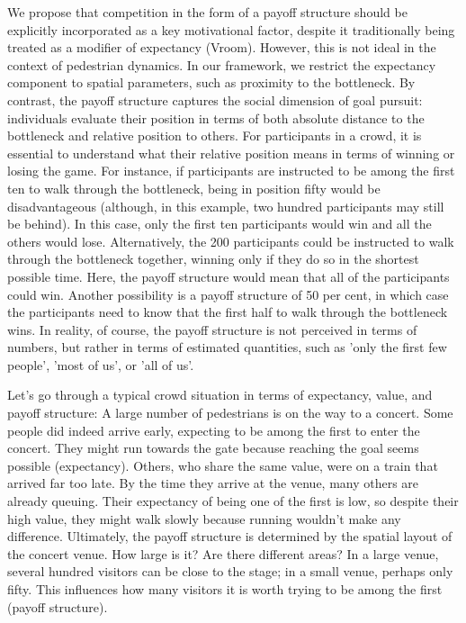 \documentclass[pdflatex,sn-mathphys-num]{sn-jnl}%
\theoremstyle{thmstyleone}%
\theoremstyle{thmstyletwo}%
\theoremstyle{thmstylethree}%
\begin{document}
We propose that competition in the form of a payoff structure should be explicitly incorporated as a key motivational factor, despite it traditionally being treated as a modifier of expectancy (Vroom). However, this is not ideal in the context of pedestrian dynamics. In our framework, we restrict the expectancy component to spatial parameters, such as proximity to the bottleneck. By contrast, the payoff structure captures the social dimension of goal pursuit: individuals evaluate their position in terms of both absolute distance to the bottleneck and relative position to others. For participants in a crowd, it is essential to understand what their relative position means in terms of winning or losing the game. For instance, if participants are instructed to be among the first ten to walk through the bottleneck, being in position fifty would be disadvantageous (although, in this example, two hundred participants may still be behind). In this case, only the first ten participants would win and all the others would lose. Alternatively, the 200 participants could be instructed to walk through the bottleneck together, winning only if they do so in the shortest possible time. Here, the payoff structure would mean that all of the participants could win. Another possibility is a payoff structure of 50 per cent, in which case the participants need to know that the first half to walk through the bottleneck wins. In reality, of course, the payoff structure is not perceived in terms of numbers, but rather in terms of estimated quantities, such as 'only the first few people', 'most of us', or 'all of us'.  


Let's go through a typical crowd situation in terms of expectancy, value, and payoff structure: A large number of pedestrians is on the way to a concert. Some people did indeed arrive early, expecting to be among the first to enter the concert. They might run towards the gate because reaching the goal seems possible (expectancy). Others, who share the same value, were on a train that arrived far too late. By the time they arrive at the venue, many others are already queuing. Their expectancy of being one of the first is low, so despite their high value, they might walk slowly because running wouldn't make any difference. Ultimately, the payoff structure is determined by the spatial layout of the concert venue. How large is it? Are there different areas? In a large venue, several hundred visitors can be close to the stage; in a small venue, perhaps only fifty. This influences how many visitors it is worth trying to be among the first (payoff structure).
\end{document}
